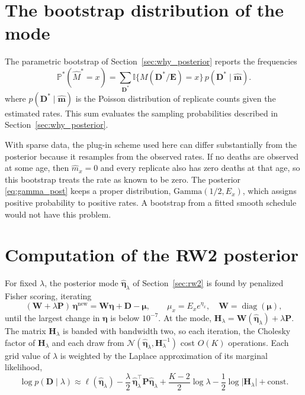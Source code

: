 \documentclass[12pt, letterpaper]{article}
\begin{document}
\section{The bootstrap distribution of the mode}
\label{app:bootstrap}

The parametric bootstrap of Section~\ref{sec:why_posterior} reports the frequencies
\begin{equation}
\mathbb{P}^\ast(\hat M^\ast = x) = \sum_{\bm{D}^\ast} \mathbb{I}\{M(\bm{D}^\ast/\bm{E}) = x\}\, p(\bm{D}^\ast \mid \hat{\bm{m}}).
\label{eq:boot}
\end{equation}
where $p(\bm{D}^\ast \mid \hat{\bm{m}})$ is the Poisson distribution of replicate counts given the estimated rates. This sum evaluates the sampling probabilities described in Section~\ref{sec:why_posterior}.

With sparse data, the plug-in scheme used here can differ substantially from the posterior because it resamples from the observed rates. If no deaths are observed at some age, then $\hat m_x = 0$ and every replicate also has zero deaths at that age, so this bootstrap treats the rate as known to be zero. The posterior \eqref{eq:gamma_post} keeps a proper distribution, $\text{Gamma}(1/2, E_x)$, which assigns positive probability to positive rates. A bootstrap from a fitted smooth schedule would not have this problem.

\section{Computation of the RW2 posterior}
\label{app:computation}

For fixed $\lambda$, the posterior mode $\hat{\bm{\eta}}_\lambda$ of Section~\ref{sec:rw2} is found by penalized Fisher scoring, iterating
\begin{equation}
(\bm{W} + \lambda \bm{P})\, \bm{\eta}^{\text{new}} = \bm{W} \bm{\eta} + \bm{D} - \bm{\mu},
\qquad \mu_x = E_x e^{\eta_x}, \quad \bm{W} = \operatorname{diag}(\bm{\mu}),
\label{eq:scoring}
\end{equation}
until the largest change in $\bm{\eta}$ is below $10^{-7}$. At the mode, $\bm{H}_\lambda = \bm{W}(\hat{\bm{\eta}}_\lambda) + \lambda \bm{P}$. The matrix $\bm{H}_\lambda$ is banded with bandwidth two, so each iteration, the Cholesky factor of $\bm{H}_\lambda$ and each draw from $\mathcal{N}(\hat{\bm{\eta}}_\lambda, \bm{H}_\lambda^{-1})$ cost $O(K)$ operations. Each grid value of $\lambda$ is weighted by the Laplace approximation of its marginal likelihood,
\begin{equation}
\log p(\bm{D} \mid \lambda) \approx \ell(\hat{\bm{\eta}}_\lambda) - \frac{\lambda}{2}\, \hat{\bm{\eta}}_\lambda^\top \bm{P} \hat{\bm{\eta}}_\lambda + \frac{K-2}{2} \log \lambda - \frac{1}{2} \log \lvert \bm{H}_\lambda \rvert + \text{const}.
\label{eq:marglik}
\end{equation}
\end{document}
